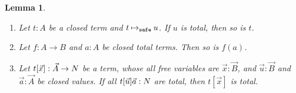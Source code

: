 \documentclass{article}
\newtheorem{lemma}[theorem]{Lemma}
\begin{document}
\begin{lemma}\label{lem:total_value}
  \begin{enumerate}
  \item\label{lem:total_value1}
    Let $t:A$ be a closed term and $t \mathbin{\mathbin{\mapsto}_{\hbox{\scriptsize \tt safe}}} u$.
    If $u$ is total, then so is $t$.
  \item\label{lem:total_value2}
    Let $f:A \rightarrow B$ and $a:A$ be closed \emph{total} terms.
    Then so is $f(a)$.
  \item\label{lem:total_value3}
    Let $t[\vec{x}]:\vec{A}\rightarrow{N}$ be a term,
    whose all free variables are $\vec{x}:\vec{B}$,
    and $\vec{u}:\vec{B}$ and $\vec{a}:\vec{A}$ be closed values.
    If all $t[\vec{u}]\vec{a}:{N}$ are total, then $t[\vec{x}]$ is total. 
  \end{enumerate}
\end{lemma}
\end{document}
